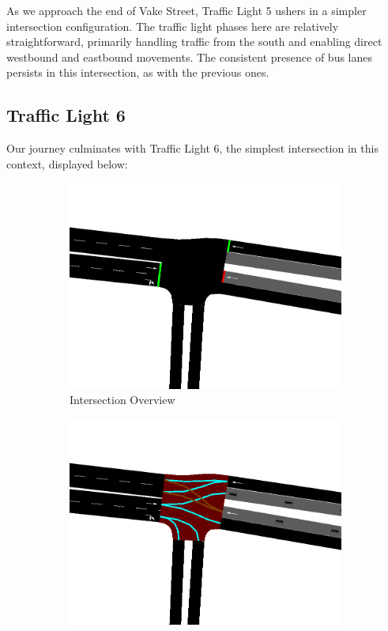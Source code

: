 \newpage
As we approach the end of Vake Street, Traffic Light 5 ushers in a simpler intersection configuration. The traffic light phases here are relatively straightforward, primarily handling traffic from the south and enabling direct westbound and eastbound movements. The consistent presence of bus lanes persists in this intersection, as with the previous ones.

\subsection{Traffic Light 6} \label{sec:tl-6}
Our journey culminates with Traffic Light 6, the simplest intersection in this context, displayed below:

\begin{figure}[h]
    \centering
    \begin{subfigure}{0.45\textwidth}
        \centering
        \includegraphics[width=\linewidth]{images/methodology/tl-6-street.png}
        \caption{Intersection Overview}
    \end{subfigure}
    \hfill
    \begin{subfigure}{0.45\textwidth}
        \centering
        \includegraphics[width=\linewidth]{images/methodology/tl-6-directions.png}

\end{subfigure}
\end{figure}

